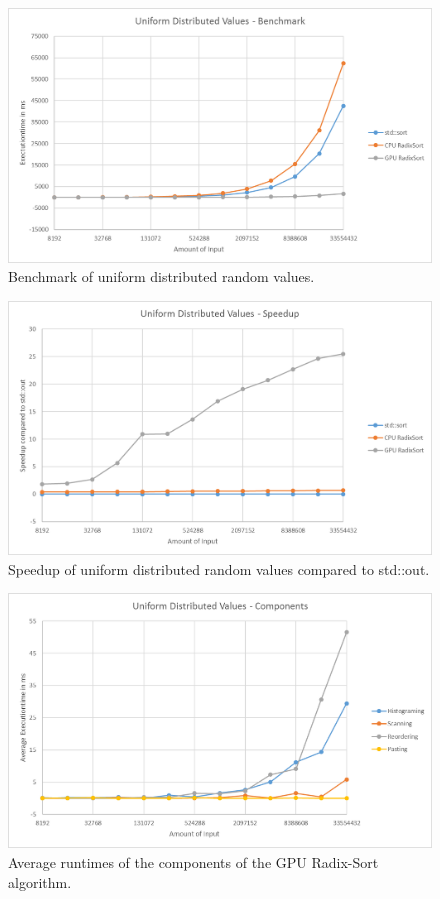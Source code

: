 \documentclass{llncs}
\begin{document}
\begin{figure}
  \begin{center}
    \includegraphics[width=\columnwidth]{charts/uniform_benchmark.png}
  \end{center}
  \caption{Benchmark of uniform distributed random values.}\label{fig:uniform_bench}
\end{figure}

\begin{figure}
  \begin{center}
    \includegraphics[width=\columnwidth]{charts/uniform_speedup.png}
  \end{center}
  \caption{Speedup of uniform distributed random values compared to std::out.}\label{fig:uniform_speedup}
\end{figure}

\begin{figure}
  \begin{center}
    \includegraphics[width=\columnwidth]{charts/uniform_details.png}
  \end{center}
  \caption{Average runtimes of the components of the GPU Radix-Sort algorithm.}\label{fig:components}
\end{figure}



\end{document}
